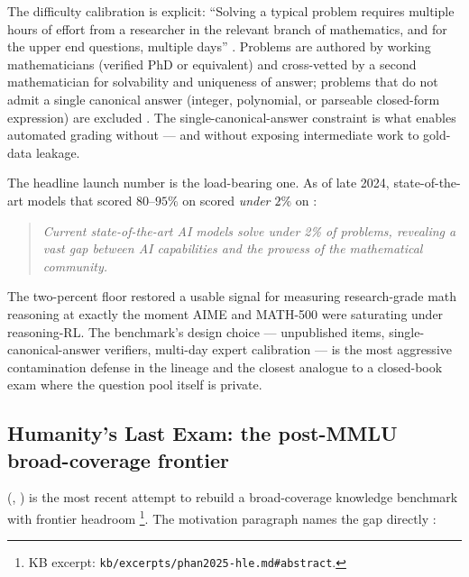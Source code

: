 The difficulty calibration is explicit: ``Solving a typical problem
requires multiple hours of effort from a researcher in the relevant
branch of mathematics, and for the upper end questions, multiple days''
\citep[\S{}sec-difficulty]{glazer2024-frontiermath}. Problems are
authored by working mathematicians (verified PhD or equivalent) and
cross-vetted by a second mathematician for solvability and uniqueness
of answer; problems that do not admit a single canonical answer
(integer, polynomial, or parseable closed-form expression) are
excluded \citep[\S{}sec-verification]{glazer2024-frontiermath}. The
single-canonical-answer constraint is what enables automated grading
without  --- and without exposing intermediate work to
gold-data leakage.

The headline launch number is the load-bearing one. As of late 2024,
state-of-the-art models that scored $80\text{--}95\%$ on  scored
\emph{under $2\%$} on  \citep[\S{}sec-launch-result,\S{}abstract]{glazer2024-frontiermath}:

\begin{quote}\itshape
Current state-of-the-art AI models solve under 2\% of problems,
revealing a vast gap between AI capabilities and the prowess of the
mathematical community.
\end{quote}

The two-percent floor restored a usable signal for measuring
research-grade math reasoning at exactly the moment AIME and MATH-500
were saturating under reasoning-RL. The benchmark's design choice ---
unpublished items, single-canonical-answer verifiers, multi-day
expert calibration --- is the most aggressive contamination defense in
the lineage and the closest analogue to a closed-book exam where the
question pool itself is private.

\subsection{Humanity's Last Exam: the post-MMLU broad-coverage frontier}
\label{sec:knowledge-hle}

\citet{phan2025-hle} (, ) is the most recent
attempt to rebuild a broad-coverage knowledge benchmark with frontier
headroom%
\footnote{KB excerpt: \texttt{kb/excerpts/phan2025-hle.md\#abstract}.}.
The motivation paragraph names the gap directly
\citep[\S{}abstract]{phan2025-hle}:

